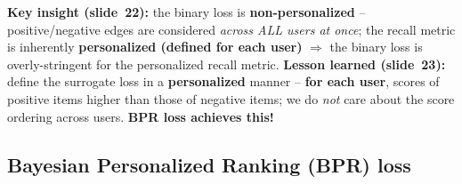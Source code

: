 \begin{keyidea}
  \textbf{Key insight (slide~22):} the binary loss is
  \textbf{non-personalized} -- positive/negative edges are considered
  \emph{across ALL users at once}; the recall metric is inherently
  \textbf{personalized (defined for each user)} $\Rightarrow$ the binary loss
  is overly-stringent for the personalized recall metric.
  \textbf{Lesson learned (slide~23):} define the surrogate loss in a
  \textbf{personalized} manner -- \textbf{for each user}, scores of positive
  items higher than those of negative items; we do \emph{not} care about the
  score ordering across users. \textbf{BPR loss achieves this!}
\end{keyidea}

\subsection{Bayesian Personalized Ranking (BPR) loss}\label{sec:lec11-bpr}

